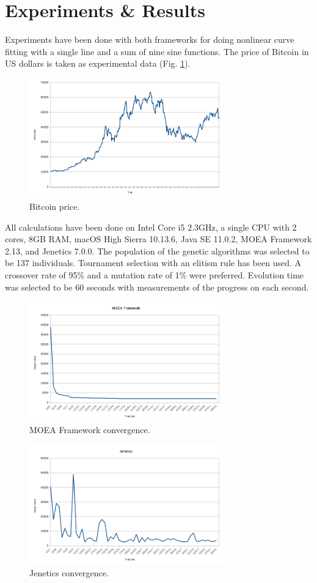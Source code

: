 \documentclass[conference]{IEEEtran}
\begin{document}
\section{Experiments \& Results}

Experiments have been done with both frameworks for doing nonlinear curve fitting with a single line and a sum of nine sine functions. The price of Bitcoin in US dollars is taken as experimental data (Fig. \ref{fig01}).

\begin{figure}[htbp]
\centerline{\includegraphics[width=8.4cm]{fig01.png}}
\caption{Bitcoin price.}
\label{fig01}
\end{figure}

All calculations have been done on Intel Core i5 2.3GHz, a single CPU with 2 cores, 8GB RAM, macOS High Sierra 10.13.6, Java SE
11.0.2, MOEA Framework 2.13, and Jenetics 7.0.0. The population of the genetic algorithms was selected to be 137 individuals. Tournament selection with an elitism rule has been used. A crossover rate of 95\% and a mutation rate of 1\% were preferred. Evolution time was selected to be 60 seconds with measurements of the progress on each second. 

\begin{figure}[htbp]
\centerline{\includegraphics[width=8.4cm]{fig02.png}}
\caption{MOEA Framework convergence.}
\label{fig02}
\end{figure}

\begin{figure}[htbp]
\centerline{\includegraphics[width=8.4cm]{fig03.png}}
\caption{Jenetics convergence.}
\label{fig03}
\end{figure}
\end{document}
